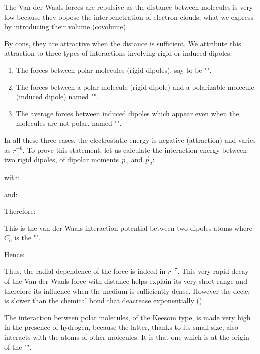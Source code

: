 	The Van der Waals forces are repulsive as the distance between molecules is very low because they oppose the interpenetration of electron clouds, what we express by introducing their volume (covolume).

	By cons, they are attractive when the distance is sufficient. We attribute this attraction to three types of interactions involving rigid or induced dipoles:
	\begin{enumerate}
		\item The forces between polar molecules (rigid dipoles), say to be "".

		\item The forces between a polar molecule (rigid dipole) and a polarizable molecule (induced dipole) named "".

		\item	The average forces between induced dipoles which appear even when the molecules are not polar, named "".
	\end{enumerate}
	In all these three cases, the electrostatic energy is negative (attraction) and varies as $r^{-6}$. To prove this statement, let us calculate the interaction energy between two rigid dipoles, of dipolar moments $\vec{p}_1$ and $\vec{p}_2$:
	
	with:
	
	and:
	
	Therefore:
	
	This is the van der Waals interaction potential between two dipoles atoms where $C_6$ is the "".
	
	Hence:
	
	Thus, the radial dependence of the force is indeed in $r^{-7}$. This very rapid decay of the Van der Waals force with distance helps explain its very short range and therefore its influence when the medium is sufficiently dense. However the decay is slower than the chemical bond that deacrease exponentially ().
	\begin{tcolorbox}[title=Remark,colframe=black,arc=10pt]
	The interaction between polar molecules, of the Keesom type, is made very high in the presence of hydrogen, because the latter, thanks to its small size, also interacts with the atoms of other molecules. It is that one which is at the origin of the "".
	\end{tcolorbox}
	
